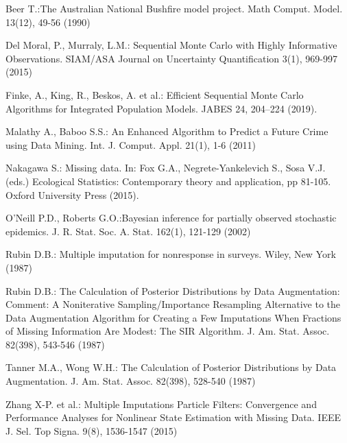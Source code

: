 \documentclass[11pt,a4paper]{article}
\begin{document}
\begin{thebibliography}{}

Beer T.:The Australian National Bushfire model project. Math Comput. Model. 13(12), 49-56 (1990)

Del Moral, P., Murraly, L.M.: Sequential Monte Carlo with Highly Informative Observations. SIAM/ASA Journal on Uncertainty Quantification 3(1), 969-997 (2015)

Finke, A., King, R., Beskos, A. et al.: Efficient Sequential Monte Carlo Algorithms for Integrated Population Models. JABES 24, 204–224 (2019).

Malathy A., Baboo S.S.: An Enhanced Algorithm to Predict a Future Crime using Data Mining. Int. J. Comput. Appl. 21(1), 1-6 (2011)

Nakagawa S.: Missing data. In: Fox G.A., Negrete-Yankelevich S., Sosa V.J. (eds.) Ecological Statistics: Contemporary theory and application, pp 81-105. Oxford University Press (2015). 

O'Neill P.D., Roberts G.O.:Bayesian inference for partially observed stochastic epidemics. J. R. Stat. Soc. A. Stat. 162(1), 121-129 (2002)

Rubin D.B.: Multiple imputation for nonresponse in surveys. Wiley, New York (1987)

Rubin D.B.: The Calculation of Posterior Distributions by Data Augmentation: Comment: A Noniterative Sampling/Importance Resampling Alternative to the Data Augmentation Algorithm for Creating a Few Imputations When Fractions of Missing Information Are Modest: The SIR Algorithm. J. Am. Stat. Assoc. 82(398), 543-546 (1987)

Tanner M.A., Wong W.H.: The Calculation of Posterior Distributions by Data Augmentation. J. Am. Stat. Assoc. 82(398), 528-540 (1987)

Zhang X-P. et al.: Multiple Imputations Particle Filters: Convergence and Performance Analyses for Nonlinear State Estimation with Missing Data. IEEE J. Sel. Top Signa. 9(8), 1536-1547 (2015)

\end{thebibliography}
\end{document}
